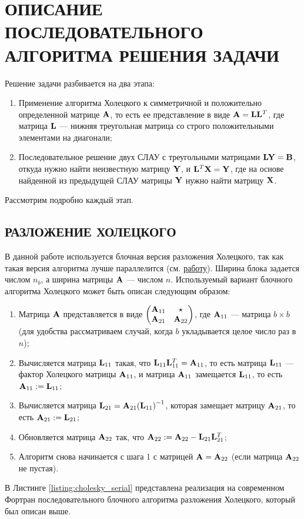 \section{ОПИСАНИЕ ПОСЛЕДОВАТЕЛЬНОГО АЛГОРИТМА РЕШЕНИЯ ЗАДАЧИ}

Решение задачи разбивается на два этапа: 
\begin{enumerate}
    \item Применение алгоритма Холецкого к симметричной и положительно определенной матрице $\vb{A}$, то есть ее представление в виде $\vb{A} = \vb{L}\vb{L}^T$, где матрица $\vb{L}$ — нижняя треугольная матрица со строго положительными элементами на диагонали;
    \item Последовательное решение двух СЛАУ с треугольными матрицами $\vb{L}\vb{Y} = \vb{B}$, откуда нужно найти неизвестную матрицу $\vb{Y}$, и $\vb{L}^T\vb{X} = \vb{Y}$, где на основе найденной из предыдущей СЛАУ матрицы $\vb{Y}$ нужно найти матрицу $\vb{X}$.
\end{enumerate}

Рассмотрим подробно каждый этап.

\subsection{РАЗЛОЖЕНИЕ ХОЛЕЦКОГО}
\label{sec:cholesky}

В данной работе используется блочная версия разложения Холецкого, так как такая версия алгоритма лучше параллелится (см. \href{https://www.cs.utexas.edu/~flame/Notes/NotesOnCholReal.pdf}{работу}). Ширина блока задается числом $n_b$, а ширина матрицы $\vb{A}$ --- числом $n$. Используемый вариант блочного алгоритма Холецкого может быть описан следующим образом:
\begin{enumerate}
    \item Матрица $\vb{A}$ представляется в виде $\mqty(\vb{A}_{11} & \star \\ \vb{A}_{21} & \vb{A}_{22})$, где $\vb{A}_{11}$ --- матрица $b \times b$ (для удобства рассматриваем случай, когда $b$ укладывается целое число раз в $n$);
    \item Вычисляется матрица $\vb{L}_{11}$ такая, что $\vb{L}_{11} \vb{L}^T_{11} = \vb{A}_{11}$, то есть матрица $\vb{L}_{11}$ --- фактор Холецкого матрицы $\vb{A}_{11}$, и матрица $\vb{A}_{11}$ замещается $\vb{L}_{11}$, то есть $\vb{A}_{11} := \vb{L}_{11}$;
    \item Вычисляется матрица $\vb{L}_{21} = \vb{A}_{21} \qty(\vb{L}_{11})^{-1}$, которая замещает матрицу $\vb{A}_{21}$, то есть $\vb{A}_{21} := \vb{L}_{21}$;
    \item Обновляется матрица $\vb{A}_{22}$ так, что $\vb{A}_{22} := \vb{A}_{22} - \vb{L}_{21} \vb{L}^T_{21}$;
    \item Алгоритм снова начинается с шага 1 с матрицей $\vb{A} = \vb{A}_{22}$ (если матрица $\vb{A}_{22}$ не пустая).
\end{enumerate}
В Листинге \ref{listing:cholesky_serial} представлена реализация на современном Фортран последовательного блочного алгоритма разложения Холецкого, который был описан выше.

